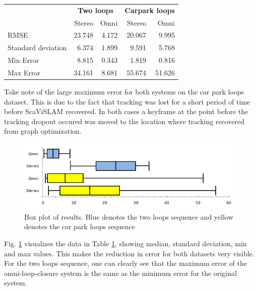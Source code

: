 \begin{table}[h]
  \centering
    \begin{tabular}{ p{5cm} r r r r} %
    \toprule
    & \multicolumn{2}{c}{\bf{Two loops}}  & \multicolumn{2}{c}{\bf{Carpark loops}} \\
    & Stereo & Omni & Stereo & Omni \\
    \midrule
    RMSE              & 23.748 & 4.172 & 20.067  &  9.995 \\
    Standard deviation& 6.374  & 1.899 & 9.591   &  5.768 \\
    Min Error         & 8.815  & 0.343 & 1.819   &  0.816 \\
    Max Error         & 34.161 & 8.681 & 55.674  & 51.626 \\
    \bottomrule
    \end{tabular}
  \label{tab:ate_results}
\end{table}

Take note of the large maximum error for both systems on the car park loops dataset.  This is due to the fact that tracking was lost for a short period of time before ScaViSLAM recovered.  In both cases a keyframe at the point before the tracking dropout occured was moved to the location where tracking recovered from graph optimization.  

\begin{figure}[h]
  \centering
    \includegraphics[width=1.00\textwidth]{chapters/images/box}
  \caption{Box plot of results.  Blue denotes the two loops sequence and yellow denotes the car park loops sequence}
  \label{fig:box_plot}
\end{figure}

Fig. \ref{fig:box_plot} visualizes the data in Table \ref{tab:ate_results}, showing median, standard deviation, min and max values.  This makes the reduction in error for both datasets very visible.  For the two loops sequence, one can clearly see that the maximum error of the omni-loop-closure system is the same as the minimum error for the original system.  

